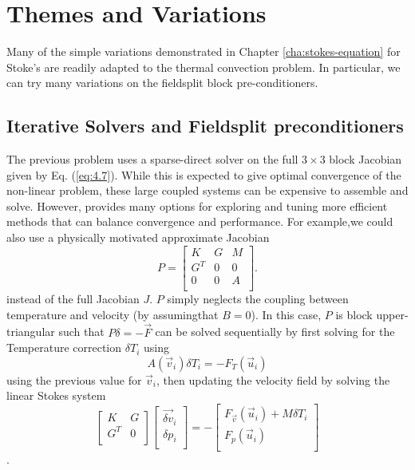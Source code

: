 \section{Themes and Variations}
\label{sec:themes-variations}

Many of the simple variations demonstrated in Chapter
\ref{cha:stokes-equation} for Stoke's  are readily adapted
to the thermal convection problem.  In particular, we can try many
variations on the fieldsplit block pre-conditioners.

\subsection{Iterative Solvers and Fieldsplit preconditioners}
\label{sec:iterative-solvers-1}

The previous problem uses a sparse-direct solver on the full
$3\times3$ block Jacobian given by Eq. (\ref{eq:4.7}).  While this is
expected to give optimal convergence of the non-linear problem, these
large coupled systems can be expensive to assemble and solve. However,
\TF{} provides many options for exploring and tuning more efficient
methods that can balance convergence and performance.  For example,we
could also use a physically motivated approximate Jacobian
\begin{equation}
  \label{eq:4.9}
   P = \left[
\begin{array}{ccc}
  K & G  & M \\
  G^{T} & 0 & 0 \\
  0 & 0 & A \\ 
  \end{array}
  \right].
\end{equation}
instead of the full Jacobian $J$. $P$ simply neglects the coupling between temperature and velocity
(by  assumingthat $B=0$).  In this case, $P$ is block
upper-triangular such that $P\delta = -\vec{F}$  can be solved
sequentially by first solving for the Temperature correction $\delta
T_{i}$ using
\begin{equation}
  \label{eq:4.14}
  A(\vec{v}_i)\delta T_i = -F_{T}(\vec{u}_i)
\end{equation}
using the previous value for $\vec{v}_i$, then updating the velocity field by solving the linear
Stokes system
\begin{equation}
  \label{eq:4.8}
   \left[
\begin{array}{cc}
  K & G  \\
  G^{T} & 0 \\
  \end{array}
  \right]
  \left[
    \begin{array}{c}
      \vec{\delta v}_i \\
      \delta p_i \\
    \end{array}
  \right] = -\left[
    \begin{array}{c}
      F_{\vec{v}}(\vec{u}_{i}) + M\delta T_{i}\\
      F_p(\vec{u}_{i})\\
    \end{array}
  \right]
\end{equation} .


